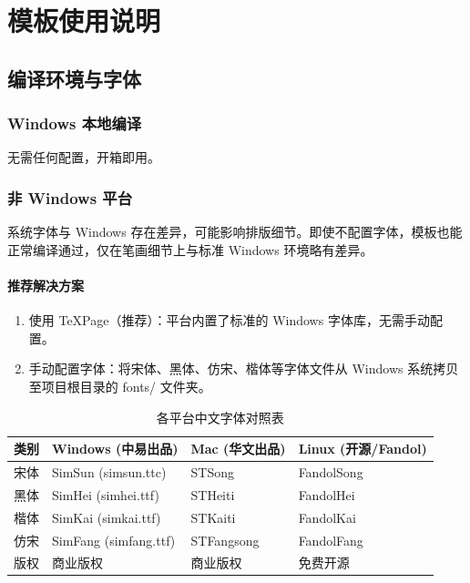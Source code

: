 
\chapter{模板使用说明}

\section{编译环境与字体}

\subsection{Windows 本地编译}

无需任何配置，开箱即用。

\subsection{非 Windows 平台}

系统字体与 Windows 存在差异，可能影响排版细节。即使不配置字体，模板也能正常编译通过，仅在笔画细节上与标准 Windows 环境略有差异。

\subsubsection{推荐解决方案}

\begin{enumerate}
    \item 使用 TeXPage（推荐）：平台内置了标准的 Windows 字体库，无需手动配置。
    \item 手动配置字体：将宋体、黑体、仿宋、楷体等字体文件从 Windows 系统拷贝至项目根目录的 fonts/ 文件夹。
\end{enumerate}

\begin{table}[htbp]
    \centering
    \caption{各平台中文字体对照表}
    \label{tab:fonts}
    \begin{tabular}{llll}
        \toprule
        类别 & Windows (中易出品) & Mac (华文出品) & Linux (开源/Fandol) \\
        \midrule
        宋体 & SimSun (simsun.ttc) & STSong & FandolSong \\
        黑体 & SimHei (simhei.ttf) & STHeiti & FandolHei \\
        楷体 & SimKai (simkai.ttf) & STKaiti & FandolKai \\
        仿宋 & SimFang (simfang.ttf) & STFangsong & FandolFang \\
        版权 & 商业版权 & 商业版权 & 免费开源 \\
        \bottomrule
    \end{tabular}
\end{table}

